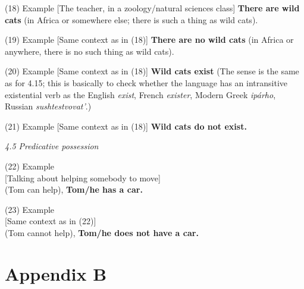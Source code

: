 \documentclass[output=paper]{langsci/langscibook}
\begin{document}
\begin{unindented}
(18) Example [The teacher, in a zoology/natural sciences class]
\textbf{There are wild cats} (in Africa or somewhere else; there is such a
thing as wild cats). 

(19) Example [Same context as in (18)] \textbf{There are no
wild cats} (in Africa or anywhere, there is no such thing as wild cats). 

(20) Example [Same context as in (18)] \textbf{Wild cats exist} (The sense
is the same as for 4.15; this is basically to check whether the language
has an intransitive existential verb as the English \textit{exist}, French
\textit{exister}, Modern Greek \textit{ipárho}, Russian
\textit{sushtestvovat’}.) 

(21) Example [Same context as in (18)] \textbf{Wild cats do not exist.} 

\textit{4.5 Predicative possession}

(22) Example\\
{}[Talking about helping somebody to move]\\
(Tom can help), \textbf{Tom/he has a car.}

(23) Example\\
{}[Same context as in (22)]\\
(Tom cannot help), \textbf{Tom/he does not have a car.}
\end{unindented}

\section*{Appendix B}\label{AppendixB}
\end{document}
